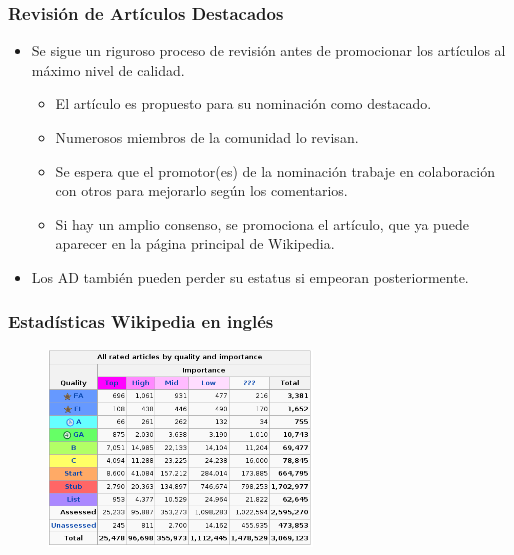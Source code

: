 
\begin{frame}
\frametitle{Revisión de Artículos Destacados}

  \begin{itemize}

    \item Se sigue un riguroso proceso de revisión antes de promocionar los
artículos al máximo nivel de calidad. 

    \begin{itemize}
     \item El artículo es propuesto para su nominación como destacado.
     \item Numerosos miembros de la comunidad lo revisan.
     \item Se espera que el promotor(es) de la nominación trabaje en
colaboración con otros para mejorarlo según los comentarios.
     \item Si hay un amplio consenso, se promociona el artículo, que ya puede
aparecer en la página principal de Wikipedia.
    \end{itemize}
    \item Los AD también pueden perder su estatus si empeoran posteriormente.
  \end{itemize}

\end{frame}


\begin{frame}
\frametitle{Estadísticas Wikipedia en inglés}

\begin{figure}[htp]
\centering
\includegraphics[width=7cm]{figs/quality-articles-stats.png}
\end{figure}

\end{frame}

